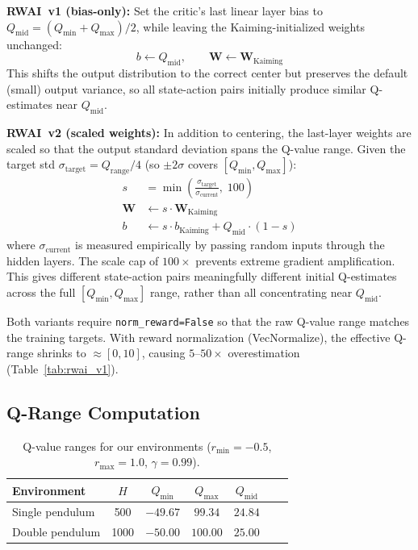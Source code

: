 \documentclass[11pt,a4paper]{article}
\begin{document}
\textbf{RWAI~v1 (bias-only):} Set the critic's last linear layer bias to $Q_{\text{mid}} = (Q_{\min} + Q_{\max})/2$, while leaving the Kaiming-initialized weights unchanged:
\begin{equation}
b \leftarrow Q_{\text{mid}}, \qquad \mathbf{W} \leftarrow \mathbf{W}_{\text{Kaiming}}
\end{equation}
This shifts the output distribution to the correct center but preserves the default (small) output variance, so all state-action pairs initially produce similar Q-estimates near $Q_{\text{mid}}$.

\textbf{RWAI~v2 (scaled weights):} In addition to centering, the last-layer weights are scaled so that the output standard deviation spans the Q-value range. Given the target std $\sigma_{\text{target}} = Q_{\text{range}}/4$ (so $\pm 2\sigma$ covers $[Q_{\min}, Q_{\max}]$):
\begin{align}
s &= \min\!\left(\frac{\sigma_{\text{target}}}{\sigma_{\text{current}}},\; 100\right) \\
\mathbf{W} &\leftarrow s \cdot \mathbf{W}_{\text{Kaiming}} \\
b &\leftarrow s \cdot b_{\text{Kaiming}} + Q_{\text{mid}} \cdot (1 - s)
\end{align}
where $\sigma_{\text{current}}$ is measured empirically by passing random inputs through the hidden layers. The scale cap of $100\times$ prevents extreme gradient amplification. This gives different state-action pairs meaningfully different initial Q-estimates across the full $[Q_{\min}, Q_{\max}]$ range, rather than all concentrating near $Q_{\text{mid}}$.

Both variants require \texttt{norm\_reward=False} so that the raw Q-value range matches the training targets. With reward normalization (VecNormalize), the effective Q-range shrinks to $\approx[0, 10]$, causing $5$--$50\times$ overestimation (Table~\ref{tab:rwai_v1}).

\subsection{Q-Range Computation}

\begin{table}[h]
\centering
\caption{Q-value ranges for our environments ($r_{\min}=-0.5$, $r_{\max}=1.0$, $\gamma=0.99$).}
\begin{tabular}{lcccccc}
\toprule
Environment & $H$ & $Q_{\min}$ & $Q_{\max}$ & $Q_{\text{mid}}$ \\
\midrule
Single pendulum & 500 & $-49.67$ & $99.34$ & $24.84$ \\
Double pendulum & 1000 & $-50.00$ & $100.00$ & $25.00$ \\
\bottomrule
\end{tabular}
\label{tab:qrange}
\end{table}
\end{document}
